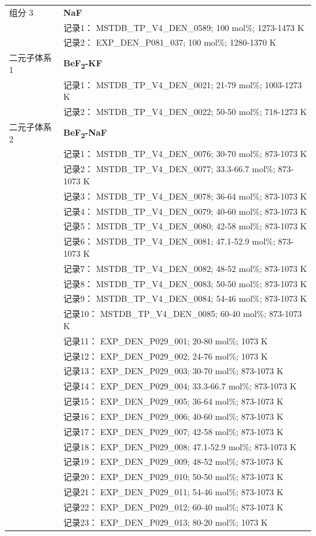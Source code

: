 \documentclass[12pt]{article}
\begin{document}
{\begin{longtable}[]{@{}
  >{\raggedright\arraybackslash}p{}
  >{\raggedright\arraybackslash}p{}@{}}
组分 3  & \textbf{NaF} \\
 & 记录1： MSTDB\_TP\_V4\_DEN\_0589; 100 mol\%; 1273-1473 K \\
 & 记录2： EXP\_DEN\_P081\_037; 100 mol\%; 1280-1370 K  \\

二元子体系 1  & \textbf{BeF\textsubscript{2}-KF} \\
 & 记录1： MSTDB\_TP\_V4\_DEN\_0021; 21-79 mol\%; 1003-1273 K \\
 & 记录2： MSTDB\_TP\_V4\_DEN\_0022; 50-50 mol\%; 718-1273 K  \\

二元子体系 2  & \textbf{BeF\textsubscript{2}-NaF} \\
 & 记录1： MSTDB\_TP\_V4\_DEN\_0076; 30-70 mol\%; 873-1073 K \\
 & 记录2： MSTDB\_TP\_V4\_DEN\_0077; 33.3-66.7 mol\%; 873-1073 K \\
 & 记录3： MSTDB\_TP\_V4\_DEN\_0078; 36-64 mol\%; 873-1073 K \\
 & 记录4： MSTDB\_TP\_V4\_DEN\_0079; 40-60 mol\%; 873-1073 K \\
 & 记录5： MSTDB\_TP\_V4\_DEN\_0080; 42-58 mol\%; 873-1073 K \\
 & 记录6： MSTDB\_TP\_V4\_DEN\_0081; 47.1-52.9 mol\%; 873-1073 K \\
 & 记录7： MSTDB\_TP\_V4\_DEN\_0082; 48-52 mol\%; 873-1073 K \\
 & 记录8： MSTDB\_TP\_V4\_DEN\_0083; 50-50 mol\%; 873-1073 K \\
 & 记录9： MSTDB\_TP\_V4\_DEN\_0084; 54-46 mol\%; 873-1073 K \\
 & 记录10： MSTDB\_TP\_V4\_DEN\_0085; 60-40 mol\%; 873-1073 K \\
 & 记录11： EXP\_DEN\_P029\_001; 20-80 mol\%; 1073 K \\
 & 记录12： EXP\_DEN\_P029\_002; 24-76 mol\%; 1073 K \\
 & 记录13： EXP\_DEN\_P029\_003; 30-70 mol\%; 873-1073 K \\
 & 记录14： EXP\_DEN\_P029\_004; 33.3-66.7 mol\%; 873-1073 K \\
 & 记录15： EXP\_DEN\_P029\_005; 36-64 mol\%; 873-1073 K \\
 & 记录16： EXP\_DEN\_P029\_006; 40-60 mol\%; 873-1073 K \\
 & 记录17： EXP\_DEN\_P029\_007; 42-58 mol\%; 873-1073 K \\
 & 记录18： EXP\_DEN\_P029\_008; 47.1-52.9 mol\%; 873-1073 K \\
 & 记录19： EXP\_DEN\_P029\_009; 48-52 mol\%; 873-1073 K \\
 & 记录20： EXP\_DEN\_P029\_010; 50-50 mol\%; 873-1073 K \\
 & 记录21： EXP\_DEN\_P029\_011; 54-46 mol\%; 873-1073 K \\
 & 记录22： EXP\_DEN\_P029\_012; 60-40 mol\%; 873-1073 K \\
 & 记录23： EXP\_DEN\_P029\_013; 80-20 mol\%; 1073 K  \\


\end{longtable}}
\end{document}
